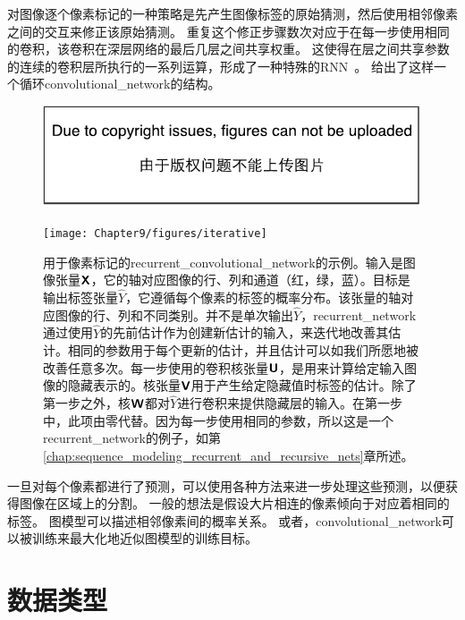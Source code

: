 对图像逐个像素标记的一种策略是先产生图像标签的原始猜测，然后使用相邻像素之间的交互来修正该原始猜测。
重复这个修正步骤数次对应于在每一步使用相同的卷积，该卷积在深层网络的最后几层之间共享权重\citep{jain2007supervised}。
这使得在层之间共享参数的连续的卷积层所执行的一系列运算，形成了一种特殊的\gls{RNN}~\citep{Pinheiro+Collobert-ICML2014,Pinheiro+Collobert-CVPR2015}。
给出了这样一个循环\gls{convolutional_network}的结构。
\begin{figure}[!htb]
\ifOpenSource
\centerline{\includegraphics{figure.pdf}}
\else
\centerline{\texttt{[image: Chapter9/figures/iterative]}}
\fi
\captionsetup{singlelinecheck=off}
\caption[.]{用于像素标记的\gls{recurrent_convolutional_network}的示例。输入是图像张量$\textsf{\textbf{X}}$，它的轴对应图像的行、列和通道（红，绿，蓝）。目标是输出标签张量$\mathit{\hat{Y}}$，它遵循每个像素的标签的概率分布。该张量的轴对应图像的行、列和不同类别。并不是单次输出$\mathit{\hat{Y}}$，\gls{recurrent_network}通过使用$\mathit{\hat{Y}}$的先前估计作为创建新估计的输入，来迭代地改善其估计。相同的参数用于每个更新的估计，并且估计可以如我们所愿地被改善任意多次。每一步使用的卷积核张量$\textsf{\textbf{U}}$，是用来计算给定输入图像的隐藏表示的。核张量$\textsf{\textbf{V}}$用于产生给定隐藏值时标签的估计。除了第一步之外，核$\textsf{\textbf{W}}$都对$\mathit{\hat{Y}}$进行卷积来提供隐藏层的输入。在第一步中，此项由零代替。因为每一步使用相同的参数，所以这是一个\gls{recurrent_network}的例子，如第\ref{chap:sequence_modeling_recurrent_and_recursive_nets}章所述。}
\label{fig:chap9_iterative}
\end{figure}

 
一旦对每个像素都进行了预测，可以使用各种方法来进一步处理这些预测，以便获得图像在区域上的分割\citep{Briggman-et-al-NIPS2009,Turaga2010,Farabet-et-al-2013}。
一般的想法是假设大片相连的像素倾向于对应着相同的标签。
图模型可以描述相邻像素间的概率关系。
或者，\gls{convolutional_network}可以被训练来最大化地近似图模型的训练目标\citep{Ning-et-al-2005,Thompson-et-al-NIPS2014}。

\section{数据类型}
\label{sec:data_types}

